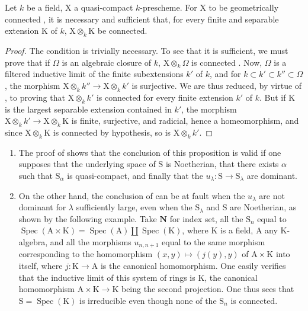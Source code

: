 \begin{corollary}[8.4.5]
\label{IV.8.4.5}
Let $k$ be a field, $\mathrm{X}$ a quasi-compact $k$-prescheme.
For $\mathrm{X}$ to be geometrically connected , it is necessary and sufficient that, for every finite and separable extension $\mathrm{K}$ of $k$, $\mathrm{X}\otimes_k\mathrm{K}$ be connected.
\end{corollary}

\begin{proof}
The condition is trivially necessary.
To see that it is sufficient, we must prove that if $\Omega$ is an algebraic closure of $k$, $\mathrm{X}\otimes_k\Omega$ is connected .
Now, $\Omega$ is a filtered inductive limit of the finite subextensions $k'$ of $k$, and for $k\subset k'\subset k''\subset\Omega$, the morphism $\mathrm{X}\otimes_k k''\to\mathrm{X}\otimes_k k'$ is surjective.
We are thus reduced, by virtue of , to proving that $\mathrm{X}\otimes_k k'$ is connected for every finite extension $k'$ of $k$.
But if $\mathrm{K}$ is the largest separable extension contained in $k'$, the morphism $\mathrm{X}\otimes_k k'\to\mathrm{X}\otimes_k\mathrm{K}$ is finite, surjective, and radicial, hence  a homeomorphism, and since $\mathrm{X}\otimes_k\mathrm{K}$ is connected by hypothesis, so is $\mathrm{X}\otimes_k k'$.
\end{proof}

\begin{remark}[8.4.6]
\label{IV.8.4.6}
\begin{enumerate}[label=(\roman*)]
  \item The proof of  shows that the conclusion of this proposition is valid if one supposes that the underlying space of $\mathrm{S}$ is Noetherian, that there exists $\alpha$ such that $\mathrm{S}_\alpha$ is quasi-compact, and finally that the $u_\lambda:\mathrm{S}\to\mathrm{S}_\lambda$ are dominant.
  \item On the other hand, the conclusion of  can be at fault when the $u_\lambda$ are not dominant for $\lambda$ sufficiently large, even when the $\mathrm{S}_\lambda$ and $\mathrm{S}$ are Noetherian, as shown by the following example.
Take $\mathbf{N}$ for index set, all the $\mathrm{S}_n$ equal to $\operatorname{Spec}(\mathrm{A}\times\mathrm{K})=\operatorname{Spec}(\mathrm{A})\amalg\operatorname{Spec}(\mathrm{K})$, where $\mathrm{K}$ is a field, $\mathrm{A}$ any $\mathrm{K}$-algebra, and all the morphisms $u_{n,n+1}$ equal to the same morphism corresponding to the homomorphism $(x,y)\mapsto(j(y),y)$ of $\mathrm{A}\times\mathrm{K}$ into itself, where $j:\mathrm{K}\to\mathrm{A}$ is the canonical homomorphism.
One easily verifies that the inductive limit of this system of rings is $\mathrm{K}$, the canonical homomorphism $\mathrm{A}\times\mathrm{K}\to\mathrm{K}$ being the second projection.
One thus sees that $\mathrm{S}=\operatorname{Spec}(\mathrm{K})$ is irreducible even though none of the $\mathrm{S}_n$ is connected.
\end{enumerate}
\end{remark}

